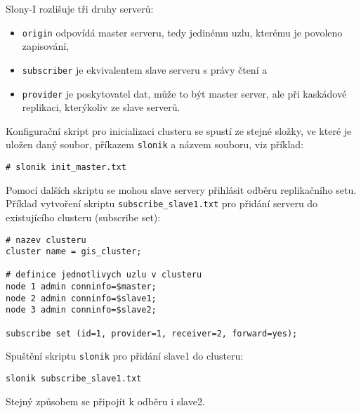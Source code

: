 Slony-I rozlišuje tři druhy serverů:
\begin{itemize}
\item \texttt{origin} odpovídá master serveru, tedy jedinému uzlu, kterému je povoleno zapisování,
\item \texttt{subscriber} je ekvivalentem slave serveru s právy čtení a 
\item \texttt{provider} je poskytovatel dat, může to být master server, ale při kaskádové replikaci, kterýkoliv ze slave serverů. 
\end{itemize}

Konfigurační skript pro inicializaci clusteru se spustí ze stejné složky, ve které je uložen daný soubor, příkazem \texttt{slonik} a názvem souboru, viz příklad:

\begin{lstlisting}
# slonik init_master.txt
\end{lstlisting}

Pomocí dalších skriptu se mohou slave servery přihlásit odběru replikačního setu. Příklad vytvoření skriptu \texttt{subscribe\_slave1.txt} pro přidání serveru do existujícího clusteru (subscribe set):

\begin{lstlisting}[identifierstyle=\color{black},stringstyle=\color{black},keywordstyle=\color{black}]
# nazev clusteru
cluster name = gis_cluster;

# definice jednotlivych uzlu v clusteru
node 1 admin conninfo=$master;
node 2 admin conninfo=$slave1;
node 3 admin conninfo=$slave2;

subscribe set (id=1, provider=1, receiver=2, forward=yes);
\end{lstlisting}

Spuštění skriptu \texttt{slonik} pro přidání slave1 do clusteru:

\begin{lstlisting}
slonik subscribe_slave1.txt
\end{lstlisting}

Stejný způsobem se připojít k odběru i slave2.
